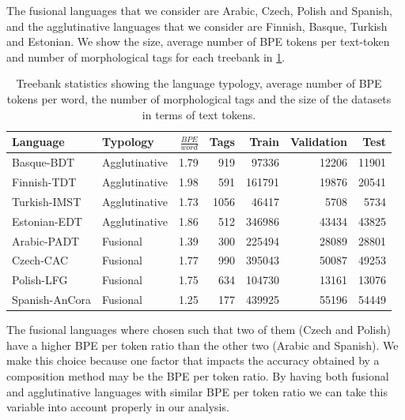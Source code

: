 \documentclass[11pt]{article}
\newcommand\jp[1]{(\textbf{JP:} #1)}
\begin{document}
    
           	The fusional languages that we consider are Arabic, Czech,
     Polish and Spanish, and the agglutinative languages that we
     consider are Finnish, Basque, Turkish and Estonian.  We show the
     size, average number of BPE tokens per text-token and number of
     morphological tags for each treebank in \cref{tab:data}.
    

    
    
    	\begin{table} %
		\centering
		\begin{tabular}{l|lrrrrr}
			Language & Typology & $\frac{BPE}{word}$ & Tags & Train & Validation & Test \\
			\hline
			Basque-BDT      & Agglutinative & 1.79 & 919 & 97336 & 12206 & 11901 \\
			Finnish-TDT     & Agglutinative & 1.98 & 591 & 161791 & 19876 & 20541 \\
			Turkish-IMST    & Agglutinative & 1.73 & 1056 & 46417 & 5708 & 5734 \\
			Estonian-EDT    & Agglutinative & 1.86 & 512 & 346986 & 43434 & 43825 \\
            Arabic-PADT     & Fusional & 1.39 & 300 & 225494 & 28089 & 28801  \\
			Czech-CAC       & Fusional & 1.77 & 990 & 395043 & 50087 & 49253 \\
			Polish-LFG      & Fusional & 1.75 & 634 & 104730 & 13161 & 13076 \\
			Spanish-AnCora  & Fusional & 1.25 & 177 & 439925 & 55196 & 54449 \\
        \end{tabular}
    		\caption{\label{tab:data} Treebank statistics showing the
     language typology, average number of BPE tokens per word, the
     number of morphological tags and the size of the datasets in
     terms of text tokens.}
	\end{table}
    
        The fusional languages where chosen such that two of them
        (Czech and Polish) have a higher BPE per token ratio than the
        other two (Arabic and Spanish). We make this choice because
        one factor that impacts the accuracy obtained by a composition
        method may be the BPE per token ratio.  By having both
        fusional and agglutinative languages with similar BPE per
        token ratio we can take this variable into account properly in
        our analysis.
\end{document}
